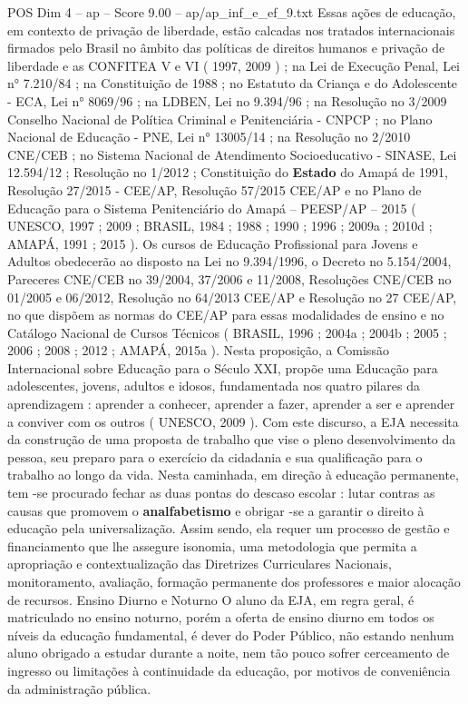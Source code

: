 \begin{textsample}{POS Dim 4 – ap – Score 9.00 – ap/ap\_inf\_e\_ef\_9.txt}
Essas ações de educação, em contexto de privação de liberdade, estão calcadas nos tratados internacionais firmados pelo Brasil no âmbito das políticas de direitos humanos e privação de liberdade e as CONFITEA V e VI ( 1997, 2009 ) ; na Lei de Execução Penal, Lei n{\EmojiFont °} 7.210/84 ; na Constituição de 1988 ; no Estatuto da Criança e do Adolescente - ECA, Lei n{\EmojiFont °} 8069/96 ; na LDBEN, Lei no 9.394/96 ; na Resolução no 3/2009 Conselho Nacional de Política Criminal e Penitenciária - CNPCP ; no Plano Nacional de Educação - PNE, Lei n{\EmojiFont °} 13005/14 ; na Resolução no 2/2010 CNE/CEB ; no Sistema Nacional de Atendimento Socioeducativo - SINASE, Lei 12.594/12 ; Resolução no 1/2012 ; Constituição do \textbf{Estado} do Amapá de 1991, Resolução 27/2015 - CEE/AP, Resolução 57/2015 CEE/AP e no Plano de Educação para o Sistema Penitenciário do Amapá – PEESP/AP – 2015 ( UNESCO, 1997 ; 2009 ; BRASIL, 1984 ; 1988 ; 1990 ; 1996 ; 2009a ; 2010d ; AMAPÁ, 1991 ; 2015 ).
Os cursos de Educação Profissional para Jovens e Adultos obedecerão ao disposto na Lei no 9.394/1996, o Decreto no 5.154/2004, Pareceres CNE/CEB no 39/2004, 37/2006 e 11/2008, Resoluções CNE/CEB no 01/2005 e 06/2012, Resolução no 64/2013 CEE/AP e Resolução no 27 CEE/AP, no que dispõem as normas do CEE/AP para essas modalidades de ensino e no Catálogo Nacional de Cursos Técnicos ( BRASIL, 1996 ; 2004a ; 2004b ; 2005 ; 2006 ; 2008 ; 2012 ; AMAPÁ, 2015a ).
Nesta proposição, a Comissão Internacional sobre Educação para o Século XXI, propõe uma Educação para adolescentes, jovens, adultos e idosos, fundamentada nos quatro pilares da aprendizagem : aprender a conhecer, aprender a fazer, aprender a ser e aprender a conviver com os outros ( UNESCO, 2009 ).
Com este discurso, a EJA necessita da construção de uma proposta de trabalho que vise o pleno desenvolvimento da pessoa, seu preparo para o exercício da cidadania e sua qualificação para o trabalho ao longo da vida.
Nesta caminhada, em direção à educação permanente, tem -se procurado fechar as duas pontas do descaso escolar : lutar contras as causas que promovem o \textbf{analfabetismo} e obrigar -se a garantir o direito à educação pela universalização.
Assim sendo, ela requer um processo de gestão e financiamento que lhe assegure isonomia, uma metodologia que permita a apropriação e contextualização das Diretrizes Curriculares Nacionais, monitoramento, avaliação, formação permanente dos professores e maior alocação de recursos.
Ensino Diurno e Noturno O aluno da EJA, em regra geral, é matriculado no ensino noturno, porém a oferta de ensino diurno em todos os níveis da educação fundamental, é dever do Poder Público, não estando nenhum aluno obrigado a estudar durante a noite, nem tão pouco sofrer cerceamento de ingresso ou limitações à continuidade da educação, por motivos de conveniência da administração pública.

\end{textsample}
